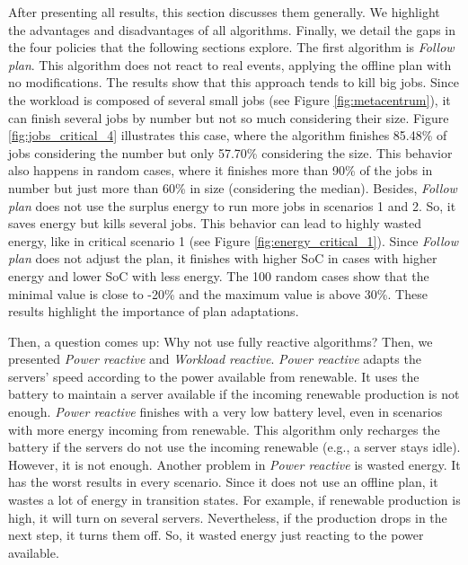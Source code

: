 After presenting all results, this section discusses them generally. We highlight the advantages and disadvantages of all algorithms. Finally, we detail the gaps in the four policies that the following sections explore. The first algorithm is \emph{Follow plan}. This algorithm does not react to real events, applying the offline plan with no modifications. The results show that this approach tends to kill big jobs. Since the workload is composed of several small jobs (see Figure \ref{fig:metacentrum}), it can finish several jobs by number but not so much considering their size. Figure \ref{fig:jobs_critical_4} illustrates this case, where the algorithm finishes 85.48\% of jobs considering the number but only 57.70\% considering the size. This behavior also happens in random cases, where it finishes more than 90\% of the jobs in number but just more than 60\% in size (considering the median). Besides, \emph{Follow plan} does not use the surplus energy to run more jobs in scenarios 1 and 2. So, it saves energy but kills several jobs. This behavior can lead to highly wasted energy, like in critical scenario 1 (see Figure \ref{fig:energy_critical_1}). Since \emph{Follow plan} does not adjust the plan, it finishes with higher SoC in cases with higher energy and lower SoC with less energy. The 100 random cases show that the minimal value is close to -20\% and the maximum value is above 30\%. These results highlight the importance of plan adaptations.

Then, a question comes up: Why not use fully reactive algorithms? Then, we presented \emph{Power reactive} and \emph{Workload reactive}. \emph{Power reactive} adapts the servers' speed according to the power available from renewable. It uses the battery to maintain a server available if the incoming renewable production is not enough. \emph{Power reactive} finishes with a very low battery level, even in scenarios with more energy incoming from renewable. This algorithm only recharges the battery if the servers do not use the incoming renewable (e.g., a server stays idle). However, it is not enough. Another problem in \emph{Power reactive} is wasted energy. It has the worst results in every scenario. Since it does not use an offline plan, it wastes a lot of energy in transition states. For example, if renewable production is high, it will turn on several servers. Nevertheless, if the production drops in the next step, it turns them off. So, it wasted energy just reacting to the power available.

